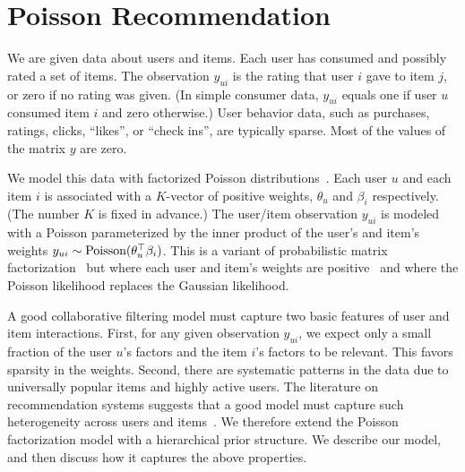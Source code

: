 \section{Poisson Recommendation}
\label{sec:model}


We are given data about users and items.  Each user has consumed and
possibly rated a set of items.  The observation $y_{ui}$ is the rating
that user $i$ gave to item $j$, or zero if no rating was given.  (In
simple consumer data, $y_{ui}$ equals one if user $u$ consumed item
$i$ and zero otherwise.)  User behavior data, such as purchases,
ratings, clicks, ``likes'', or ``check ins'', are typically sparse.
Most of the values of the matrix $y$ are zero.

We model this data with factorized Poisson
distributions~\cite{Canny:2004}. Each user $u$ and each item $i$ is
associated with a $K$-vector of positive weights, $\theta_u$ and
$\beta_i$ respectively.  (The number $K$ is fixed in advance.)  The
user/item observation $y_{ui}$ is modeled with a Poisson parameterized
by the inner product of the user's and item's weights $y_{ui} \sim
\textrm{Poisson}(\theta_u^\top \beta_i)$.  This is a variant of probabilistic
matrix factorization~\cite{Salakhutdinov:2008a} but where each user
and item's weights are positive~\cite{Lee:1999} and where the Poisson
likelihood replaces the Gaussian likelihood.

A good collaborative filtering model must capture two basic features
of user and item interactions. First, for any given observation
$y_{ui}$, we expect only a small fraction of the user $u$'s factors
and the item $i$'s factors to be relevant. This favors sparsity in the
weights. Second, there are systematic patterns in the data due to
universally popular items and highly active users. The
literature on recommendation systems suggests that a good model must
capture such heterogeneity across users and items~\cite{Koren:2009}. We
therefore extend the Poisson factorization model with a hierarchical
prior structure. We describe our model, and then discuss how it
captures the above properties.


